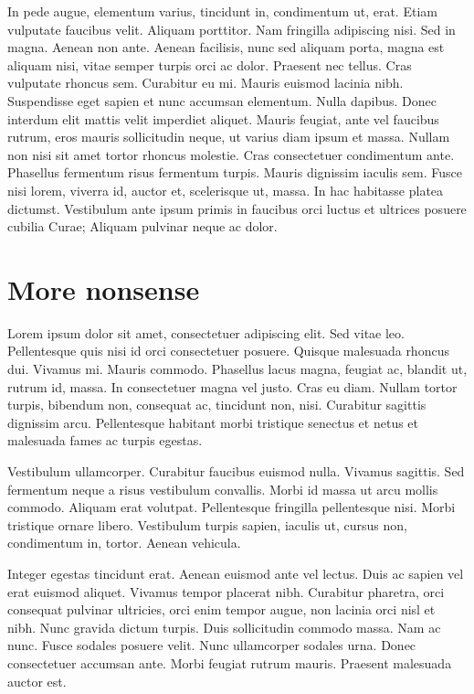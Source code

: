 In pede augue, elementum varius, tincidunt in,
condimentum ut, erat. Etiam vulputate faucibus velit. Aliquam porttitor.
Nam fringilla adipiscing nisi. Sed in magna. Aenean non ante. Aenean
facilisis, nunc sed aliquam porta, magna est aliquam nisi, vitae semper
turpis orci ac dolor. Praesent nec tellus. Cras vulputate rhoncus sem.
Curabitur eu mi. Mauris euismod lacinia nibh. Suspendisse eget sapien et
nunc accumsan elementum.  Nulla dapibus. Donec interdum elit mattis velit
imperdiet aliquet. Mauris feugiat, ante vel faucibus rutrum, eros mauris
sollicitudin neque, ut varius diam ipsum et massa. Nullam non nisi sit amet
tortor rhoncus molestie. Cras consectetuer condimentum ante. Phasellus
fermentum risus fermentum turpis. Mauris dignissim iaculis sem. Fusce nisi
lorem, viverra id, auctor et, scelerisque ut, massa. In hac habitasse
platea dictumst. Vestibulum ante ipsum primis in faucibus orci luctus et
ultrices posuere cubilia Curae; Aliquam pulvinar neque ac dolor.

\section{More nonsense}
Lorem ipsum dolor sit amet, consectetuer adipiscing elit. Sed vitae leo.
Pellentesque quis nisi id orci consectetuer posuere. Quisque malesuada
rhoncus dui. Vivamus mi. Mauris commodo. Phasellus lacus magna, feugiat ac,
blandit ut, rutrum id, massa. In consectetuer magna vel justo. Cras eu
diam. Nullam tortor turpis, bibendum non, consequat ac, tincidunt non,
nisi. 
Curabitur sagittis dignissim arcu. Pellentesque habitant morbi
tristique senectus et netus et malesuada fames ac turpis egestas.

Vestibulum ullamcorper. Curabitur faucibus euismod nulla. Vivamus sagittis.
Sed fermentum neque a risus vestibulum convallis. Morbi id massa ut arcu
mollis commodo. Aliquam erat volutpat.  Pellentesque fringilla pellentesque
nisi. Morbi tristique ornare libero. Vestibulum turpis sapien, iaculis ut,
cursus non, condimentum in, tortor. Aenean vehicula. 

Integer egestas
tincidunt erat. Aenean euismod ante vel lectus. Duis ac sapien vel erat
euismod aliquet. Vivamus tempor placerat nibh. Curabitur pharetra, orci
consequat pulvinar ultricies, orci enim tempor augue, non lacinia orci nisl
et nibh. Nunc gravida dictum turpis.  Duis sollicitudin commodo massa. Nam
ac nunc. Fusce sodales posuere velit. Nunc ullamcorper sodales urna. Donec
consectetuer accumsan ante. Morbi feugiat rutrum mauris. Praesent malesuada
auctor est. 

